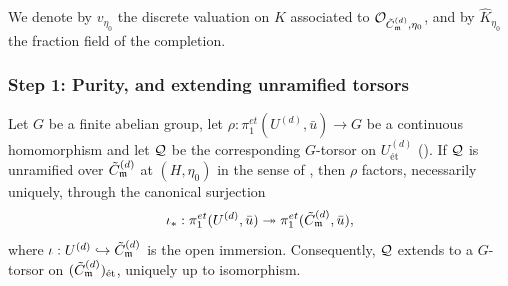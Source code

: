 We denote by $v_{\eta_0}$ the discrete valuation on $K$ associated to $\mathcal{O}_{\tilde{C}_{\mathfrak{m}}^{(d)}, \eta_0}$,
and by $\widehat{K}_{\eta_0}$ the fraction field of the completion.

\subsubsection*{Step 1: Purity, and extending unramified torsors}

\begin{prop}\label{prop:extension_via_purity_r2}
    Let $G$ be a finite abelian group, let $\rho : \pi_1^{et}(U^{(d)}, \bar{u}) \to G$ be a continuous
    homomorphism and let $\mathcal{Q}$ be the corresponding $G$-torsor on $U^{(d)}_{\text{\'et}}$
    ().
    If $\mathcal{Q}$ is unramified over $\tilde{C}_{\mathfrak{m}}^{(d)}$ at $(H, \eta_0)$ in the sense of
    , then $\rho$ factors, necessarily uniquely, through the
    canonical surjection
    \[ \iota_* : \pi_1^{et}(U^{(d)}, \bar{u}) \twoheadrightarrow \pi_1^{et}(\tilde{C}_{\mathfrak{m}}^{(d)}, \bar{u}), \]
    where $\iota : U^{(d)} \hookrightarrow \tilde{C}_{\mathfrak{m}}^{(d)}$ is the open immersion.
    Consequently, $\mathcal{Q}$ extends to a $G$-torsor on $(\tilde{C}_{\mathfrak{m}}^{(d)})_{\text{\'et}}$, uniquely up to isomorphism.
\end{prop}
